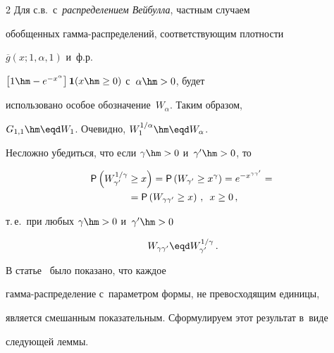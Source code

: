 \begin{multicols}{2}
Для с.в.\ с~\textit{распределением Вейбулла}, частным случаем


обобщенных гам\-ма-рас\-пре\-де\-ле\-ний, соответствующим плотности


$\overline{g}(x;1,\alpha,1)$ и~ф.р.\


$\left[1\hm-e^{-x^{\alpha}}\right]{\bf 1}(x\hm\ge0)$ с~$\alpha\hm>0$, будет


использовано особое обозначение~$W_{\alpha}$. Таким образом,


$G_{1,1}\hm\eqd W_1$. Очевидно, $W_1^{1/\alpha}\hm\eqd W_{\alpha}$.





Несложно убедиться, что если $\gamma\hm>0$ и~$\gamma'\hm>0$, то 


\begin{multline*}


{\sf P} \left(W_{\gamma'}^{1/\gamma}\ge x\right)=


{\sf P}\left(W_{\gamma'}\ge x^{\gamma}\right)=


e^{-x^{\gamma\gamma'}}={}\\


{}={\sf P}\left(W_{\gamma\gamma'}\ge x\right)\,,\enskip


x\ge 0\,,


\end{multline*}


 т.\,е.\ при любых $\gamma\hm>0$ и~$\gamma'\hm>0$


\begin{equation}


W_{\gamma\gamma'}\eqd W_{\gamma'}^{1/\gamma}\,.


\label{e7-kgz}


\end{equation}





В статье~\cite{Gleser1989} было показано, что каждое


гам\-ма-рас\-пре\-де\-ле\-ние с~параметром формы, не пре\-вос\-ходящим единицы,


является смешанным по\-ка\-зательным. Сформулируем этот результат в~виде\linebreak


сле\-ду\-ющей леммы.





\smallskip






\end{multicols}
